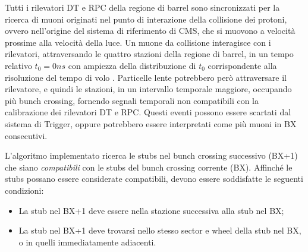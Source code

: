 Tutti i rilevatori DT e RPC della regione di barrel sono sincronizzati per la ricerca di muoni originati nel punto di interazione della collisione dei protoni, ovvero nell'origine del sistema di riferimento di CMS, che si muovono a velocità prossime alla velocità della luce. Un muone da collisione interagisce con i rilevatori, attraversando le quattro stazioni della regione di barrel, in un tempo relativo $t_0 = 0 \si{ns}$ con ampiezza della distribuzione di $t_0$ corrispondente alla risoluzione del tempo di volo \cite{MasterThesisGioMoc}. Particelle lente potrebbero però attraversare il rilevatore, e quindi le stazioni, in un intervallo temporale maggiore, occupando più bunch crossing, fornendo segnali temporali non compatibili con la calibrazione dei rilevatori DT e RPC. Questi eventi possono essere scartati dal sistema di Trigger, oppure potrebbero essere interpretati come più muoni in BX consecutivi.


\begin{figure}[t]
  \centering
  \centering
  \caption{}
  \label{fig:CMSLayout}
\end{figure}


L'algoritmo implementato ricerca le stubs nel bunch crossing successivo (BX+1) che siano \textit{compatibili} con le stubs del bunch crossing corrente (BX). Affinché le stubs possano essere considerate compatibili, devono essere soddisfatte le seguenti condizioni:

\begin{itemize}
  \item La stub nel BX+1 deve essere nella stazione successiva alla stub nel BX;
  \item La stub nel BX+1 deve trovarsi nello stesso sector e wheel della stub nel BX, o in quelli immediatamente adiacenti.
\end{itemize}


